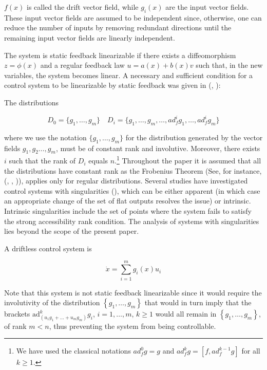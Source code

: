 \documentclass[10pt]{article}
\newcommand{\3}{\mathbf{3}}
\newcommand{\2}{\mathbf{2}}
\newcommand{\1}{\mathbf{1}}
\newcommand{\0}{\mathbf{0}}
\newcommand{\ad}{\mathrm{ad}}
\begin{document}
$f(x)$ is called the drift vector field, while $g_i(x)$ are the input vector fields. These input vector fields are assumed to be independent since, otherwise, one can reduce the number of inputs by removing redundant directions until the remaining input vector fields are linearly independent.

The system is static feedback linearizable if there exists a diffeomorphism $z=\phi(x)$ and a regular feedback law $u=a(x)+b(x)v$ such that, in the new variables, the system becomes linear. A necessary and sufficient condition for a control system to be linearizable by static feedback was given in (\cite{HSM}, \cite{JR}):

The distributions

\[ D_0=\{ g_1,\dots,g_m \} \quad D_i=\{g_1,\dots,g_m, \dots, ad_f^i g_1,\dots,ad_f^i g_m \} \]

where we use the notation $\{g_1,\dots,g_m\}$ for the distribution generated by the vector fields $g_1,g_2\dots,g_m$, must be of constant rank and involutive. Moreover, there exists $i$ such that the rank of $D_i$ equals $n$.\footnote{We have used the classical notations $ad_{f}^{0}g=g$ and $ad_{f}^{k}g = [f, ad_{f}^{k-1}g]$ for all $k\geq 1$.} Throughout the paper it is assumed that all the distributions have constant rank as the Frobenius Theorem  (See, for instance, (\cite{Chevalley}, \cite{Isidori}, \cite{NVdS})), applies only for regular distributions. Several studies have investigated control systems with singularities (\cite{KLO}), which can be either apparent (in which case an appropriate change of the set of flat outputs resolves the issue) or intrinsic. Intrinsic singularities include the set of points where the system fails to satisfy the strong accessibility rank condition. The analysis of systems with singularities lies beyond the scope of the present paper.


A driftless control system is

\begin{equation} \dot{x}=\sum_{i=1}^{m} g_i(x)u_i \label{driftless} \end{equation}

Note that this system is not static feedback linearizable since it would require the involutivity of the distribution $ \left\{g_{1}, \dots , g_{m}\right\}$ that would in turn imply that  the brackets $\ad^{k}_{\left( u_{1}g_{1} + \dots + u_{m}g_{m}\right)} g_{i}$, $i=1,\dots,m$, $k\geq 1$ would all remain in $ \left\{g_{1}, \dots, g_{m}\right\}$, of rank $m < n$, thus preventing the system from being controllable.
\end{document}
